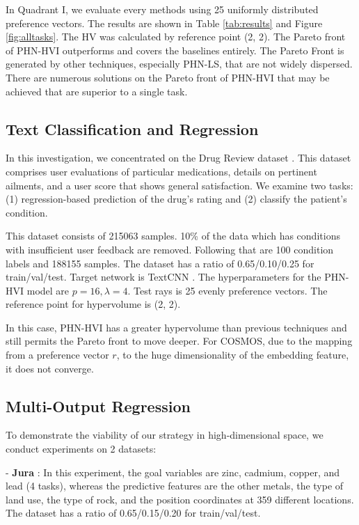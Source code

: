 \documentclass[letterpaper]{article} %
\newcommand{\ourmodel}{PHN-HVI }
\begin{document}
In Quadrant I, we evaluate every methods using 25 uniformly distributed preference vectors. The results are shown in Table \ref{tab:results} and Figure \ref{fig:alltasks}. The HV was calculated by reference point (2, 2). The Pareto front of \ourmodel outperforms and covers the baselines entirely. The Pareto Front is generated by other techniques, especially PHN-LS, that are not widely dispersed. There are numerous solutions on the Pareto front of \ourmodel that may be achieved that are superior to a single task.

\subsection{Text Classification and Regression}


In this investigation, we concentrated on the Drug Review dataset \cite{Felix2018}. This dataset comprises user evaluations of particular medications, details on pertinent ailments, and a user score that shows general satisfaction. We examine two tasks: (1) regression-based prediction of the drug's rating and (2) classify the patient's condition.

This dataset consists of 215063 samples. 10\% of the data which has conditions with insufficient user feedback are removed.
Following that are 100 condition labels and 188155 samples. The dataset has a ratio of 0.65/0.10/0.25 for train/val/test. Target network is TextCNN \cite{TextCNN}. The hyperparameters for the \ourmodel model are $p=16, \lambda=4$. Test rays is 25 evenly preference vectors. The reference point for hypervolume is (2, 2).

In this case, \ourmodel has a greater hypervolume than previous techniques and still permits the Pareto front to move deeper. For COSMOS, due to the mapping from a preference vector $r$, to the huge dimensionality of the embedding feature, it does not converge.

\subsection{Multi-Output Regression}
To demonstrate the viability of our strategy in high-dimensional space, we conduct experiments on 2 datasets:

\indent - \textbf{Jura} \cite{Goovaerts1997}: In this experiment, the goal variables are zinc, cadmium, copper, and lead (4 tasks), whereas the predictive features are the other metals, the type of land use, the type of rock, and the position coordinates at 359 different locations. The dataset has a ratio of 0.65/0.15/0.20 for train/val/test.
\end{document}
